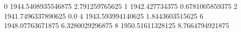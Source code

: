 0 1944.5408935546875 2.791259765625
1 1942.427734375 0.6781005859375
2 1941.7496337890625 0.0
4 1943.593994140625 1.8443603515625
6 1948.07763671875 6.3280029296875
8 1950.51611328125 8.7664794921875
